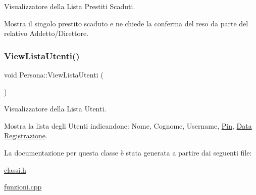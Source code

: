 Visualizzatore della Lista Prestiti Scaduti. 

Mostra il singolo prestito scaduto e ne chiede la conferma del reso da parte del relativo Addetto/\+Direttore. \mbox{\label{class_persona_ad84db334efe5f35da14f085eec7383ce}} 
\subsubsection{\texorpdfstring{View\+Lista\+Utenti()}{ViewListaUtenti()}}
{\footnotesize\ttfamily void Persona\+::\+View\+Lista\+Utenti (\begin{DoxyParamCaption}{ }\end{DoxyParamCaption})}



Visualizzatore della Lista Utenti. 

Mostra la lista degli Utenti indicandone\+: Nome, Cognome, Username, \mbox{\hyperlink{class_pin}{Pin}}, \mbox{\hyperlink{class_data}{Data}} \mbox{\hyperlink{class_registrazione}{Registrazione}}. 

La documentazione per questa classe è stata generata a partire dai seguenti file\+:\begin{DoxyCompactItemize}
\item 
\mbox{\hyperlink{classi_8h}{classi.\+h}}\item 
\mbox{\hyperlink{funzioni_8cpp}{funzioni.\+cpp}}\end{DoxyCompactItemize}
